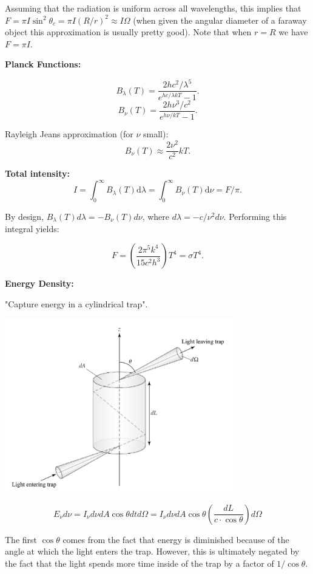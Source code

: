 \documentclass[12pt]{article}
\newcommand{\V}{

\vspace{\baselineskip}

}
\begin{document}
Assuming that the radiation is uniform across all wavelengths, this implies that $F = \pi I \sin^2\theta_c = \pi I (R/r)^2 \approx I\Omega$ (when given the angular diameter of a faraway object this approximation is usually pretty good). Note that when $r=R$ we have $F = \pi I$.\V

\textbf{Planck Functions:}

\[B_{\lambda}(T) = \frac{2hc^2/\lambda^5}{e^{hc/\lambda kT} - 1}.\]
\[B_{\nu}(T) = \frac{2h\nu^3/c^2}{e^{h\nu/kT} - 1}.\]

Rayleigh Jeans approximation (for $\nu$ small):
\[B_{\nu}(T) \approx \frac{2\nu^2}{c^2}kT.\]

\textbf{Total intensity:}
\[I = \int_0^{\infty} B_{\lambda}(T)\mathrm{d}\lambda =  \int_0^{\infty} B_{\nu}(T)\mathrm{d}\nu = F/\pi.\]

By design, $B_{\lambda}(T)d\lambda = -B_{\nu}(T)d\nu$, where $d\lambda = -c/\nu^2 d\nu$. Performing this integral yields:

\[F = \left(\frac{2\pi^5 k^4}{15c^2 h^3}\right)T^4 = \sigma T^4.\]

\textbf{Energy Density:}

"Capture energy in a cylindrical trap". 

\begin{center}
    \includegraphics[width=10cm]{images/energydensity.png}
\end{center}

\[E_{\nu}d\nu = I_{\nu}d\nu dA\cos{\theta}dtd\Omega = I_{\nu}d\nu dA\cos{\theta}\left(\frac{dL}{c\cdot \cos{\theta}}\right)d\Omega\]

The first $\cos{\theta}$ comes from the fact that energy is diminished because of the angle at which the light enters the trap. However, this is ultimately negated by the fact that the light spends more time inside of the trap by a factor of $1/\cos{\theta}$. 
\end{document}
